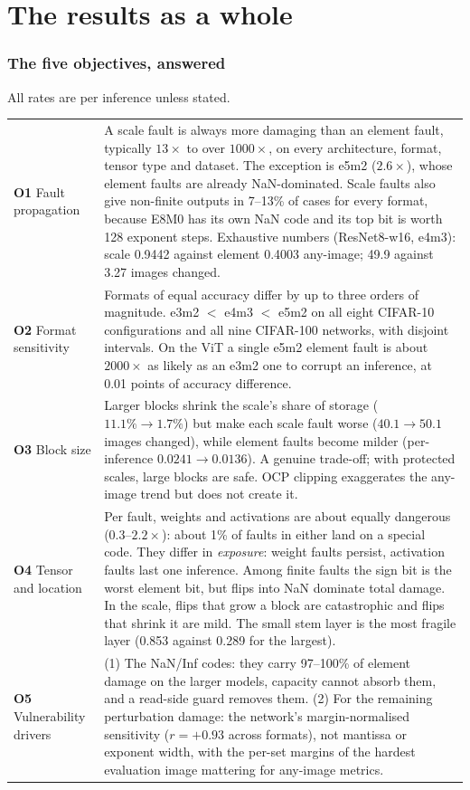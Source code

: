 \part{The results as a whole}

\section{The five objectives, answered}
All rates are per inference unless stated.

\begin{center}
\small
\begin{longtable}{@{}p{2.5cm}p{12.9cm}@{}}
\toprule
\textbf{O1} Fault propagation & A scale fault is always more damaging than an element fault, typically $13\times$ to over $1000\times$, on every architecture, format, tensor type and dataset. The exception is e5m2 ($2.6\times$), whose element faults are already NaN-dominated. Scale faults also give non-finite outputs in 7--13\% of cases for every format, because E8M0 has its own NaN code and its top bit is worth 128 exponent steps.
 Exhaustive numbers (ResNet8-w16, e4m3): scale 0.9442 against element 0.4003 any-image; 49.9 against 3.27 images changed. \\
\textbf{O2} Format sensitivity & Formats of equal accuracy differ by up to three orders of magnitude. e3m2 $<$ e4m3 $<$ e5m2 on all eight CIFAR-10 configurations and all nine CIFAR-100 networks, with disjoint intervals. On the ViT a single e5m2 element fault is about $2000\times$ as likely as an e3m2 one to corrupt an inference, at 0.01 points of accuracy difference. \\
\textbf{O3} Block size & Larger blocks shrink the scale's share of storage ($11.1\%\to1.7\%$) but make each scale fault worse ($40.1\to50.1$ images changed), while element faults become milder (per-inference $0.0241\to0.0136$). A genuine trade-off; with protected scales, large blocks are safe. OCP clipping exaggerates the any-image trend but does not create it. \\
\textbf{O4} Tensor and location & Per fault, weights and activations are about equally dangerous ($0.3$--$2.2\times$): about 1\% of faults in either land on a special code. They differ in \emph{exposure}: weight faults persist, activation faults last one inference. Among finite faults the sign bit is the worst element bit, but flips into NaN dominate total damage. In the scale, flips that grow a block are catastrophic and flips that shrink it are mild. The small stem layer is the most fragile layer (0.853 against 0.289 for the largest). \\
\textbf{O5} Vulnerability drivers & (1) The NaN/Inf codes: they carry 97--100\% of element damage on the larger models, capacity cannot absorb them, and a read-side guard removes them. (2) For the remaining perturbation damage: the network's margin-normalised sensitivity ($r=+0.93$ across formats), not mantissa or exponent width, with the per-set margins of the hardest evaluation image mattering for any-image metrics. \\
\bottomrule
\end{longtable}
\end{center}

